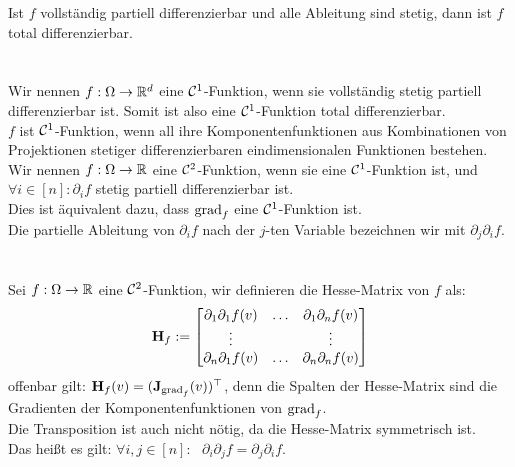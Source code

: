 Ist \(f\) vollständig partiell differenzierbar und alle Ableitung sind stetig, dann ist \(f\) total differenzierbar. \\ \\
 \\
Wir nennen \(f: \Omega \rightarrow \mathbb R^d\) eine \(\mathcal C^1\)-Funktion, wenn sie vollständig stetig partiell differenzierbar ist. Somit ist also eine \(\mathcal C^1\)-Funktion total differenzierbar. \\
\(f\) ist \(\mathcal C^1\)-Funktion, wenn all ihre Komponentenfunktionen aus Kombinationen von Projektionen stetiger differenzierbaren eindimensionalen Funktionen bestehen. \\
Wir nennen \(f: \Omega \rightarrow \mathbb R\) eine \(\mathcal C^2\)-Funktion, wenn sie eine \(\mathcal C^1\)-Funktion ist, und \(\forall i \in [n]: \partial_if\) stetig partiell differenzierbar ist. \\
Dies ist äquivalent dazu, dass \(\text{grad}_f\) eine \(\mathcal C^1\)-Funktion ist. \\Die partielle
Ableitung von \(\partial_i f\) nach der \(j\)-ten Variable bezeichnen wir mit \(\partial_j\partial_if\). \\ \\
 \\
Sei \(f: \Omega \rightarrow \mathbb R\) eine \(\mathcal C^2\)-Funktion, wir definieren die Hesse-Matrix von \(f\) als: \[\textbf{H}_f := \begin{bmatrix}
    \partial_1\partial_1f(v) & \hdots & \partial_1\partial_nf(v) \\
    \vdots & & \vdots \\
    \partial_n\partial_1f(v) & \hdots & \partial_n\partial_nf(v)
\end{bmatrix}\] offenbar gilt: \(\textbf{H}_f(v) = (\textbf{J}_{\text{grad}_f}(v))^{\top}\), denn die Spalten der Hesse-Matrix sind die
Gradienten der Komponentenfunktionen von \(\text{grad}_f\).\\
Die Transposition ist auch nicht nötig, da die Hesse-Matrix symmetrisch ist.\\ Das heißt es gilt: \(\forall i,j\in[n]{:}\text{ } \partial_i\partial_jf = \partial_j\partial_if\). \pagebreak
